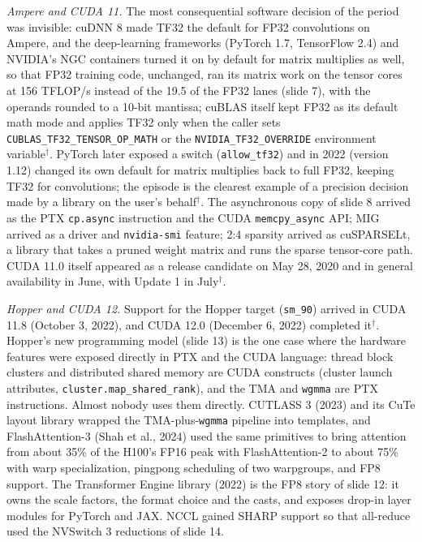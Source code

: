 \documentclass[11pt,letterpaper]{article}
\begin{document}
\emph{Ampere and CUDA 11.} The most consequential software decision of the period was invisible: cuDNN 8 made TF32 the default for FP32 convolutions on Ampere, and the deep-learning frameworks (PyTorch 1.7, TensorFlow 2.4) and NVIDIA's NGC containers turned it on by default for matrix multiplies as well, so that FP32 training code, unchanged, ran its matrix work on the tensor cores at 156 TFLOP/s instead of the 19.5 of the FP32 lanes (slide 7), with the operands rounded to a 10-bit mantissa; cuBLAS itself kept FP32 as its default math mode and applies TF32 only when the caller sets \texttt{CUBLAS\_TF32\_TENSOR\_OP\_MATH} or the \texttt{NVIDIA\_TF32\_OVERRIDE} environment variable$^\dagger$. PyTorch later exposed a switch (\texttt{allow\_tf32}) and in 2022 (version 1.12) changed its own default for matrix multiplies back to full FP32, keeping TF32 for convolutions; the episode is the clearest example of a precision decision made by a library on the user's behalf$^\dagger$. The asynchronous copy of slide 8 arrived as the PTX \texttt{cp.async} instruction and the CUDA \texttt{memcpy\_async} API; MIG arrived as a driver and \texttt{nvidia-smi} feature; 2:4 sparsity arrived as cuSPARSELt, a library that takes a pruned weight matrix and runs the sparse tensor-core path. CUDA 11.0 itself appeared as a release candidate on May 28, 2020 and in general availability in June, with Update 1 in July$^\dagger$.

\emph{Hopper and CUDA 12.} Support for the Hopper target (\texttt{sm\_90}) arrived in CUDA 11.8 (October 3, 2022), and CUDA 12.0 (December 6, 2022) completed it$^\dagger$. Hopper's new programming model (slide 13) is the one case where the hardware features were exposed directly in PTX and the CUDA language: thread block clusters and distributed shared memory are CUDA constructs (cluster launch attributes, \texttt{cluster.map\_shared\_rank}), and the TMA and \texttt{wgmma} are PTX instructions. Almost nobody uses them directly. CUTLASS 3 (2023) and its CuTe layout library wrapped the TMA-plus-\texttt{wgmma} pipeline into templates, and FlashAttention-3 (Shah et al., 2024) used the same primitives to bring attention from about 35\% of the H100's FP16 peak with FlashAttention-2 to about 75\% with warp specialization, pingpong scheduling of two warpgroups, and FP8 support. The Transformer Engine library (2022) is the FP8 story of slide 12: it owns the scale factors, the format choice and the casts, and exposes drop-in layer modules for PyTorch and JAX. NCCL gained SHARP support so that all-reduce used the NVSwitch 3 reductions of slide 14.
\end{document}
